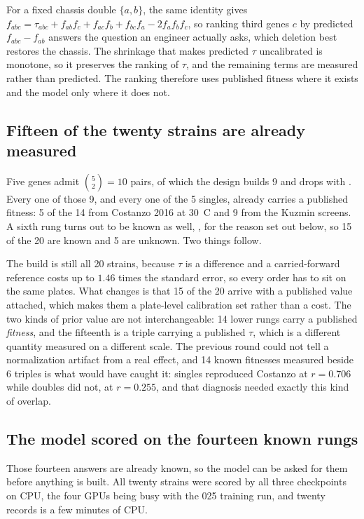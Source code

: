  For a fixed chassis double
$\{a,b\}$, the same identity gives
$f_{abc} = \tau_{abc} + f_{ab}f_c + f_{ac}f_b + f_{bc}f_a - 2f_af_bf_c$, so
ranking third genes $c$ by predicted $f_{abc} - f_{ab}$ answers the question an
engineer actually asks, which deletion best restores the chassis. The
shrinkage that makes predicted $\tau$ uncalibrated is monotone, so it preserves
the ranking of $\tau$, and the remaining terms are measured rather than
predicted. The ranking therefore uses published fitness where it exists and the
model only where it does not.

\subsection{Fifteen of the twenty strains are already measured}

Five genes admit $\binom{5}{2} = 10$ pairs, of which the design builds 9 and drops
 with . Every one of those 9, and every one of the 5
singles, already carries a published fitness: 5 of the 14 from Costanzo 2016 at
30~C and 9 from the Kuzmin screens. A sixth rung turns out to be known as well,
  , for the reason set out below, so 15 of the 20
are known and 5 are unknown. Two things follow.

The build is still all 20 strains, because $\tau$ is a difference and a
carried-forward reference costs up to $1.46$ times the standard error, so every
order has to sit on the same plates. What changes is that 15 of the 20 arrive
with a published value attached, which makes them a plate-level calibration set
rather than a cost. The two kinds of prior value are not interchangeable: 14
lower rungs carry a published \emph{fitness}, and the fifteenth is a triple
carrying a published $\tau$, which is a different quantity measured on a
different scale. The previous round could not tell a normalization artifact from
a real effect, and 14 known fitnesses measured beside 6 triples is what would
have caught it: singles reproduced Costanzo at $r = 0.706$ while doubles did not,
at $r = 0.255$, and that diagnosis needed exactly this kind of overlap.

\subsection{The model scored on the fourteen known rungs}

Those fourteen answers are already known, so the model can be asked for them before
anything is built. All twenty strains were scored by all three checkpoints on CPU,
the four GPUs being busy with the 025 training run, and twenty records is a few
minutes of CPU.

